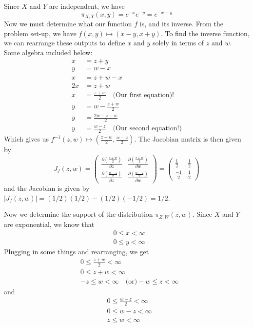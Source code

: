 \documentclass[
  letterpaper,
  DIV=11,
  numbers=noendperiod]{scrreprt}
\begin{document}
Since \(X\) and \(Y\) are independent, we have \[
\pi_{X,Y}(x,y) = e^{-x}e^{-y} = e^{-x - y}
\] Now we must determine what our function \(f\) is, and its inverse.
From the problem set-up, we have \(f(x, y) \longmapsto (x - y, x + y)\).
To find the inverse function, we can rearrange these outputs to define
\(x\) and \(y\) solely in terms of \(z\) and \(w\). Some algebra
included below: \begin{align*}
    x & = z + y \\
    y & = w - x \\
    x & = z + w - x \\
    2x & = z + w \\
    x & = \frac{z + w}{2} \quad \text{(Our first equation)!} \\
    y & = w - \frac{z + w}{2} \\
    y & = \frac{2w - z - w}{2} \\
    y & = \frac{w - z}{2} \quad \text{(Our second equation!)}
\end{align*} Which gives us
\(f^{-1}(z,w) \longmapsto (\frac{z + w}{2}, \frac{w - z}{2})\). The
Jacobian matrix is then given by \[
J_f(z,w) = \begin{pmatrix}
    \frac{\partial (\frac{z + w}{2})}{\partial z} & \frac{\partial (\frac{z + w}{2})}{\partial w} \\
     \frac{\partial (\frac{w - z}{2})}{\partial z} & \frac{\partial (\frac{w - z}{2})}{\partial w} 
\end{pmatrix} = \begin{pmatrix}
     \frac{1}{2} & \frac{1}{2} \\
     \frac{-1}{2} & \frac{1}{2}
     \end{pmatrix}
\] and the Jacobian is given by
\(|J_f(z,w)| = (1/2)(1/2) - (1/2)(-1/2) = 1/2\).

Now we determine the support of the distribution \(\pi_{Z,W} (z,w)\).
Since \(X\) and \(Y\) are exponential, we know that \begin{align*}
    & 0 \leq x < \infty \\
    & 0 \leq y < \infty
\end{align*} Plugging in some things and rearranging, we get
\begin{align*}
    & 0 \leq \frac{z + w}{2} < \infty \\
    & 0 \leq z + w < \infty \\
    & -z \leq w < \infty \quad \text{(or)} -w \leq z < \infty
\end{align*} and\\
\begin{align*}
    & 0 \leq \frac{w - z}{2} < \infty \\
    & 0 \leq w - z < \infty \\
    & z \leq w < \infty
\end{align*}
\end{document}
